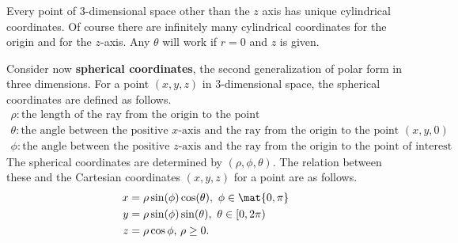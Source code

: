 \begin{center}
\end{center}

 Every point of $3$-dimensional
space other than the $z$ axis  has  unique cylindrical coordinates. Of course there are infinitely many cylindrical coordinates for the
origin and for the $z$-axis. Any $\theta $ will work if $r=0$ and $z$ is given.

Consider now \textbf{spherical coordinates}, the second generalization of polar form in three dimensions. For a point $(x,y,z)$ in $3$-dimensional space, the spherical coordinates are defined as follows.
\begin{equation*}
\begin{array}{l}
\rho: \mbox{the length of the ray from the origin to the point}\\
\theta: \mbox{the angle between the positive $x$-axis and the ray from the origin to the point $(x,y,0)$}\\
\phi: \mbox{the angle between the positive $z$-axis and the ray from the origin to the point of interest}
\end{array}
\end{equation*}
The spherical coordinates are determined by $(\rho ,\phi
,\theta)$. The relation between these and the Cartesian coordinates $(x,y,z)$ for a point
are as follows.
\begin{align*}
x& =\rho \sin (\phi) \cos (\theta) ,\ \phi \in
\mat{0,\pi}  \\
y& =\rho \sin (\phi) \sin (\theta) ,\text{ }\theta
\in \lbrack 0,2\pi ) \\
z& =\rho \cos \phi \text{, }\rho \geq 0.
\end{align*}

